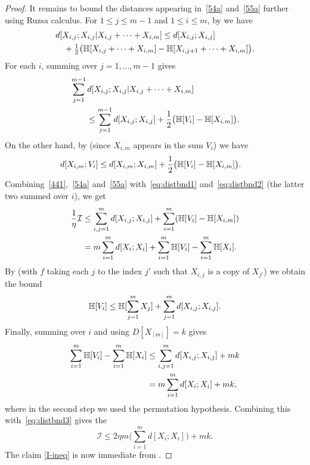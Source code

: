 \begin{proof}
It remains to bound the distances appearing in~\eqref{54a} and~\eqref{55a} further using Ruzsa calculus.
For $1 \leq j \leq m-1$ and $1 \leq i \leq m$, by  we have
\begin{align*} &d[ X_{i,j}; X_{i,j}| X_{i,j}+\cdots+X_{i,m}]
\leq d[X_{i,j}; X_{i,j}] \\
&\quad + \tfrac{1}{2} \bigl(\mathbb{H}[X_{i,j}+\cdots+X_{i,m}] - \mathbb{H}[X_{i,{j+1}}+\cdots+X_{i,m}]\bigr).
\end{align*}
For each $i$, summing over $j = 1,\dots, m-1$ gives
\begin{align}
  \nonumber
  &\sum_{j=1}^{m-1} d[X_{i,j}; X_{i,j}| X_{i,j}+\cdots+X_{i,m}] \\
  &\qquad \leq \sum_{j=1}^{m-1} d[X_{i,j}; X_{i,j}] + \frac12 \bigl( \mathbb{H}[V_i] - \mathbb{H}[X_{i,m}] \bigr).
  \label{eq:distbnd1}
\end{align}
On the other hand, by  (since $X_{i,m}$ appears in the sum $V_i$) we have
\begin{align}
  d[X_{i,m}; V_i]
  &\leq d[X_{i,m}; X_{i,m}] + \frac12 \bigl( \mathbb{H}[V_i] - \mathbb{H}[X_{i,m}] \bigr).
  \label{eq:distbnd2}
\end{align}
Combining~\eqref{441},~\eqref{54a} and~\eqref{55a} with~\eqref{eq:distbnd1} and~\eqref{eq:distbnd2} (the latter two summed over $i$), we get
\begin{align}
  \nonumber
  \frac1{\eta} {\mathcal I} &\leq \sum_{i,j=1}^m d[X_{i,j};X_{i,j}] + \sum_{i=1}^m (\mathbb{H}[V_i] - \mathbb{H}[X_{i,m}]) \\
      &= m \sum_{i=1}^m d[X_i; X_i] + \sum_{i=1}^m \mathbb{H}[V_i] - \sum_{i=1}^m \mathbb{H}[X_i].
      \label{eq:distbnd3}
\end{align}
By  (with $f$ taking each $j$ to the index $j'$ such that $X_{i,j}$ is a copy of $X_{j'}$) we obtain the bound
\[
  \mathbb{H}[V_i] \leq \mathbb{H}[\sum_{j=1}^m X_j] + \sum_{j=1}^m d[X_{i,j}; X_{i,j}].
\]
Finally, summing over $i$ and using $D[X_{[m]}] = k$ gives
\begin{align*}
  \sum_{i=1}^m \mathbb{H}[V_i] - \sum_{i=1}^m \mathbb{H}[X_i] & \leq \sum_{i,j=1}^m d[X_{i,j}; X_{i,j}] + m k \\ & = m\sum_{i = 1}^m d[X_i; X_i] + mk,
\end{align*}
where in the second step we used the permutation hypothesis. Combining this with~\eqref{eq:distbnd3} gives the
$$
{\mathcal I} \leq 2\eta m \biggl( \sum_{i=1}^m d[X_i;X_i] \biggr) + mk.$$
The claim \eqref{I-ineq} is now immediate from .
\end{proof}

